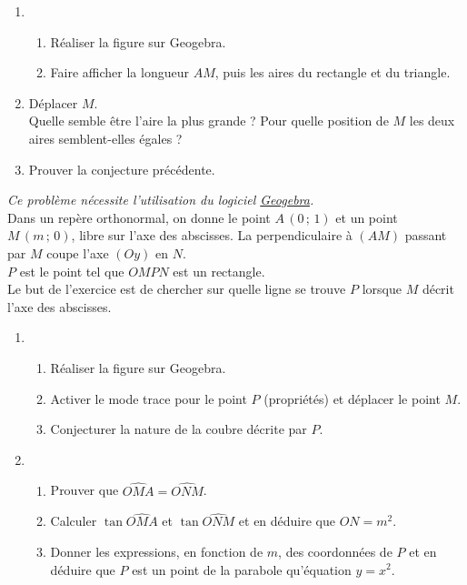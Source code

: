 \begin{multicols}{2}
\begin{prob}
 \begin{enumerate}
  \item \begin{enumerate}
         \item R\'ealiser la figure sur Geogebra.
	 \item Faire afficher la longueur $AM$, puis les aires du rectangle et du triangle.
        \end{enumerate}
 \item D\'eplacer $M$.\\
       Quelle semble \^etre l'aire la plus grande ?
       Pour quelle position de $M$ les deux aires semblent-elles \'egales ?
 \item Prouver la conjecture pr\'ec\'edente.
 \end{enumerate}

\end{prob}

\begin{prob}
 \emph{Ce probl\`eme n\'ecessite l'utilisation du logiciel \href{http://www.geogebra.org/cms/}{Geogebra}.}\\
Dans un rep\`ere orthonormal, on donne le point $A\,(0\,;\,1)$ et un point $M\,(m\,;\,0)$, libre sur l'axe des abscisses. La perpendiculaire \`a $(AM)$ passant par $M$ coupe l'axe $(Oy)$ en $N$.\\
$P$ est le point tel que $OMPN$ est un rectangle.\\
Le but de l'exercice est de chercher sur quelle ligne se trouve $P$ lorsque $M$ d\'ecrit l'axe des abscisses.
\begin{enumerate}
 \item \begin{enumerate}
	\item R\'ealiser la figure sur Geogebra.
	\item Activer le mode trace pour le point $P$ (propri\'et\'es) et d\'eplacer le point $M$.
	\item Conjecturer la nature de la coubre d\'ecrite par $P$.
	\end{enumerate}
 \item \begin{enumerate}
        \item Prouver que $\widehat{OMA}=\widehat{ONM}$.
       \item Calculer $\tan \widehat{OMA}$ et $\tan \widehat{ONM}$ et en d\'eduire que $ON=m^2$.
	\item Donner les expressions, en fonction de $m$, des coordonn\'ees de $P$ et en d\'eduire que $P$ est un point de la parabole qu'\'equation $y=x^2$.
       \end{enumerate}


\end{enumerate}
\end{prob}
\end{multicols}
